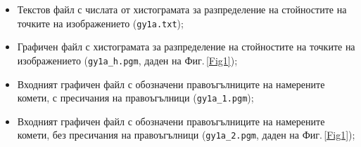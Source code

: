 \documentclass[12pt]{article}
\begin{document}
\begin{itemize}
\item
 Текстов файл с числата от хистограмата
 за разпределение на стойностите на точките на изображението
 (\verb|gy1a.txt|);
\item
 Графичен файл с хистограмата за разпределение на стойностите
 на точките на изображението
 (\verb|gy1a_h.pgm|, даден на Фиг.\,\ref{Fig1});
\item
 Входният графичен файл с обозначени правоъгълниците на намерените
 комети, с пресичания на правоъгълници
 (\verb|gy1a_1.pgm|);
\item
 Входният графичен файл с обозначени правоъгълниците на намерените
 комети, без пресичания на правоъгълници
 (\verb|gy1a_2.pgm|, даден на Фиг.\,\ref{Fig1});
 \begin{figure}[b]

\end{figure}
\end{itemize}
\end{document}
